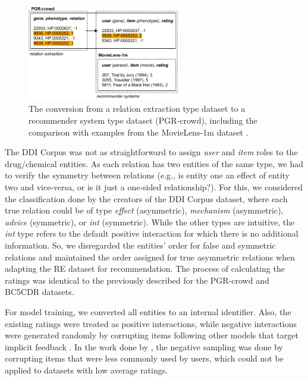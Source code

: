 \begin{figure}[!h]
\centerline{\includegraphics[width=0.6\textwidth]{images/chapter_4/datasets.pdf}}
\caption[Conversion from a Relation Extraction Type Dataset to a Recommender System Type Dataset]{The conversion from a relation extraction type dataset to a recommender system type dataset (PGR-crowd), including the comparison with examples from the MovieLens-1m dataset \citep{10.1145/2827872}.}
\label{fig:datasets}
\end{figure}

The DDI Corpus was not as straightforward to assign \textit{user} and \textit{item} roles to the drug/chemical entities. As each relation has two entities of the same type, we had to verify the symmetry between relations (e.g., is entity one an effect of entity two and vice-versa, or is it just a one-sided relationship?). For this, we considered the classification done by the creators of the DDI Corpus dataset, where each true relation could be of type \textit{effect} (asymmetric), \textit{mechanism} (asymmetric), \textit{advice} (symmetric), or \textit{int} (symmetric).  While the other types are intuitive, the \textit{int} type refers to the default positive interaction for which there is no additional information. So, we disregarded the entities' order for false and symmetric relations and maintained the order assigned for true asymmetric relations when adapting the RE dataset for recommendation. The process of calculating the ratings was identical to the previously described for the PGR-crowd and BC5CDR datasets. 

For model training, we converted all entities to an internal identifier. Also, the existing ratings were treated as positive interactions, while negative interactions were generated randomly by corrupting items following other models that target implicit feedback \citep{Wang_Wang_Xu_He_Cao_Chua_2019}. In the work done by \cite{10.1145/3308558.3313705}, the negative sampling was done by corrupting items that were less commonly used by users, which could not be applied to datasets with low average ratings. 

